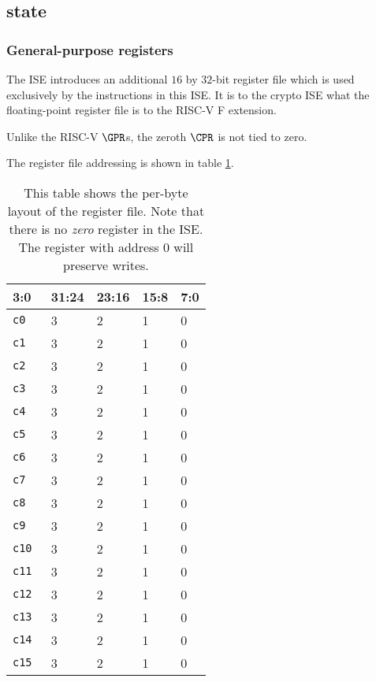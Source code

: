\subsection{\XCID state}
\label{sec:spec:state}


\subsubsection{General-purpose registers}
\label{sec:spec:state:gpr}

The ISE introduces an additional $16$ by $32$-bit register file which
is used exclusively by the instructions in this ISE.
It is to the crypto ISE what the floating-point register file is to the
RISC-V F extension.

Unlike the RISC-V $\GPR$s, the zeroth $\CPR$ is not tied to zero.

The register file addressing is shown in table \ref{tab:state-addr}.

\begin{table}[t]
\centering
\begin{tabular}{|l|l l l l|}
\hline
\multicolumn{1}{|l|}{3:0} & \textbf{31:24} & \textbf{23:16} & \textbf{15:8} & \textbf{7:0} \\ \hline
{\tt c0  } & 3 & 2 & 1 & 0      \\ \hline
{\tt c1  } & 3 & 2 & 1 & 0      \\ \hline
{\tt c2  } & 3 & 2 & 1 & 0      \\ \hline
{\tt c3  } & 3 & 2 & 1 & 0      \\ \hline
{\tt c4  } & 3 & 2 & 1 & 0      \\ \hline
{\tt c5  } & 3 & 2 & 1 & 0      \\ \hline
{\tt c6  } & 3 & 2 & 1 & 0      \\ \hline
{\tt c7  } & 3 & 2 & 1 & 0      \\ \hline
{\tt c8  } & 3 & 2 & 1 & 0      \\ \hline
{\tt c9  } & 3 & 2 & 1 & 0      \\ \hline
{\tt c10 } & 3 & 2 & 1 & 0      \\ \hline
{\tt c11 } & 3 & 2 & 1 & 0      \\ \hline
{\tt c12 } & 3 & 2 & 1 & 0      \\ \hline
{\tt c13 } & 3 & 2 & 1 & 0      \\ \hline
{\tt c14 } & 3 & 2 & 1 & 0      \\ \hline
{\tt c15 } & 3 & 2 & 1 & 0      \\ \hline
\end{tabular}
\caption{This table shows the per-byte layout of the register file.
Note that there is no {\em zero} register in the ISE.
The register with address $0$ will preserve writes.}
\label{tab:state-addr}
\end{table}

